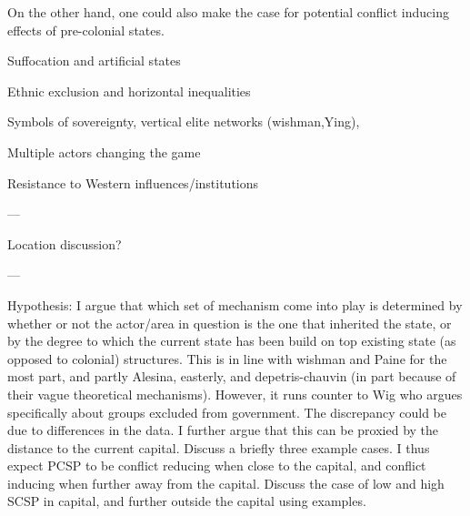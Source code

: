 \documentclass[12pt]{article}
\begin{document}
On the other hand, one could also make the case for potential conflict
inducing effects of pre-colonial states. 

Suffocation and artificial states

Ethnic exclusion and horizontal inequalities

Symbols of sovereignty, vertical elite networks (wishman,Ying),

Multiple actors changing the game

Resistance to Western influences/institutions

---

Location discussion?

---

Hypothesis: I argue that which set of mechanism come into play is determined by
whether or not the actor/area in question is the one that inherited the state,
or by the degree to which the current state has been build on top existing state
(as opposed to colonial) structures.  This is in line with wishman and Paine for
the most part, and partly Alesina, easterly, and depetris-chauvin (in part
because of their vague theoretical mechanisms). However, it runs counter to Wig
who argues specifically about groups excluded from government. The discrepancy
could be due to differences in the data. I further argue that this can be
proxied by the distance to the current capital. Discuss a briefly three example
cases. I thus expect PCSP to be conflict reducing when close to the capital, and
conflict inducing when further away from the capital. Discuss the case of low
and high SCSP in capital, and further outside the capital using examples.
\end{document}
